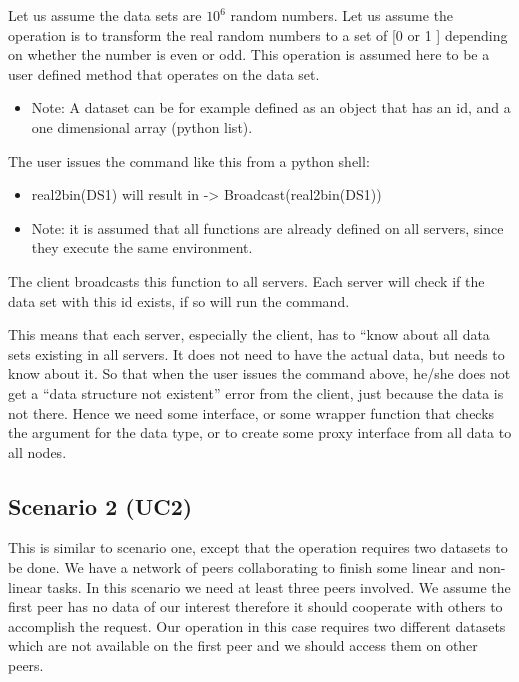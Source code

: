 Let us assume the data sets are \(10^6\) random numbers.
Let us assume the operation is to transform the real random numbers to a set of [0 or 1 ] depending on whether the number is even or odd. 
This operation is assumed here to be a user defined method that operates on the data set.

\begin{itemize}
\item Note: A dataset can be for example defined as an object that has an id, and a one dimensional array (python list).
\end{itemize}

The user issues the command like this from a python shell: 

\begin{itemize}
\item real2bin(DS1) will result in -> Broadcast(real2bin(DS1))
\item Note: it is assumed that all functions are already defined on all servers, since they execute the same environment.
\end{itemize}

The client broadcasts this function to all servers. Each server will check if the data set with this id exists, if so will run the command. 

This means that each server, especially the client, has to “know about all data sets existing in all servers.
It does not need to have the actual data, but needs to know about it. So that when the user issues the command
above, he/she does not get a “data structure not existent” error from the client, just because the data is not
there. Hence we need some interface, or some wrapper function that checks the argument for the data type, or to 
create some proxy interface from all data to all nodes. 

\subsection{Scenario 2 (UC2)}
This is similar to scenario one, except that the operation requires two datasets to be done. We have a network of peers collaborating
to finish some linear and non-linear tasks. In this scenario we need at least three peers involved. We assume the first peer has no
data of our interest therefore it should cooperate with others to accomplish the request. Our operation in this case requires two 
different datasets which are not available on the first peer and we should access them on other peers. 

